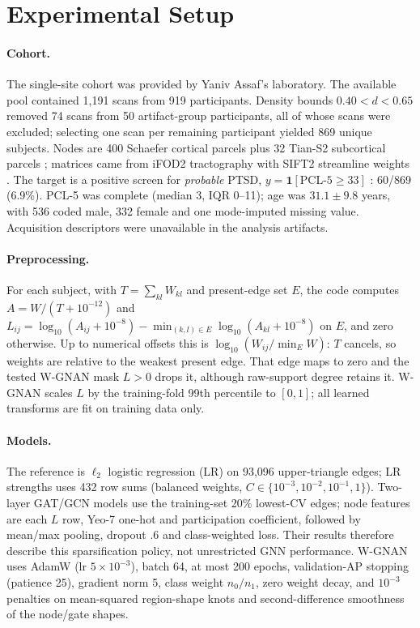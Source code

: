 \section{Experimental Setup}
\label{sec:setup}

\paragraph{Cohort.}
The single-site cohort was provided by Yaniv Assaf's laboratory. The available pool contained 1,191
scans from 919 participants. Density bounds $0.40<d<0.65$ removed 74 scans from 50 artifact-group
participants, all of whose scans were excluded; selecting one scan per remaining participant yielded 869 unique subjects. Nodes are
400 Schaefer cortical parcels \citep{schaefer2018atlas} plus 32 Tian-S2 subcortical parcels
\citep{tian2020subcortical}; matrices came from iFOD2 tractography with SIFT2 streamline weights
\citep{smith2015sift2}. The target is a positive screen for \emph{probable} PTSD,
$y=\mathbf1[\mathrm{PCL\mbox{-}5}\geq33]$ \citep{blevins2015pcl5}: 60/869 (6.9\%). PCL-5 was
complete (median 3, IQR 0--11); age was $31.1\pm9.8$ years, with 536 coded male, 332 female and one
mode-imputed missing value. Acquisition descriptors were unavailable in the analysis artifacts.

\paragraph{Preprocessing.}
For each subject, with $T=\sum_{kl}W_{kl}$ and present-edge set $E$, the code computes
$A=W/(T+10^{-12})$ and
$L_{ij}=\log_{10}(A_{ij}+10^{-8})-\min_{(k,l)\in E}\log_{10}(A_{kl}+10^{-8})$ on $E$, and zero
otherwise. Up to numerical offsets this is $\log_{10}(W_{ij}/\min_EW)$: $T$ cancels, so weights are
relative to the weakest present edge. That edge maps to zero and the tested W-GNAN mask $L>0$ drops
it, although raw-support degree retains it.
W-GNAN scales $L$ by the training-fold 99th percentile to $[0,1]$; all learned transforms are fit on
training data only.

\paragraph{Models.}
The reference is $\ell_2$ logistic regression (LR) on 93,096 upper-triangle edges; LR strengths uses
432 row sums (balanced weights, $C\in\{10^{-3},10^{-2},10^{-1},1\}$). Two-layer GAT/GCN models use
the training-set 20\% lowest-CV edges; node features are each $L$ row, Yeo-7 one-hot and participation
coefficient, followed by mean/max pooling, dropout .6 and class-weighted loss. Their results therefore
describe this sparsification policy, not unrestricted GNN performance. W-GNAN uses AdamW (lr
$5\times10^{-3}$), batch 64, at most 200 epochs, validation-AP stopping (patience 25), gradient norm
5, class weight $n_0/n_1$, zero weight decay, and $10^{-3}$ penalties on mean-squared region-shape
knots and second-difference smoothness of the node/gate shapes.

